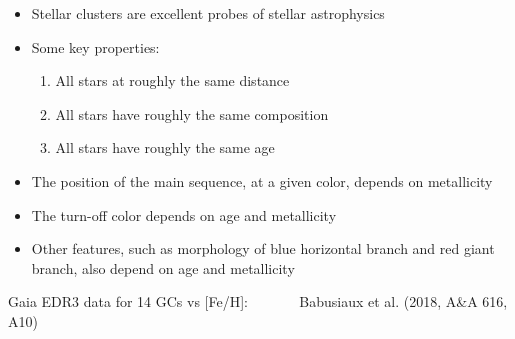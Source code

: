 \documentclass[letterpaper,landscape]{slides}
\begin{document}
\begin{slide}
{\begin{minipage}[t]{12cm}
\begin{itemize}
\item Stellar clusters are excellent probes of stellar astrophysics
\item {\color{blue} Some key properties:} 
   \begin{enumerate}
      \item All stars at roughly the same distance
      \item All stars have roughly the same composition
      \item All stars have roughly the same age
   \end{enumerate}
\item The position of the main sequence, at a given color, 
       depends on metallicity 
\item The turn-off color depends on age and metallicity 
\item Other features, such as morphology of blue horizontal 
   branch and red giant branch, also depend on age and metallicity 

\end{itemize}

\end{minipage}}
\vfill 
\end{slide}




\begin{slide}
	\begin{center}
		\begin{minipage}{6in}
			\vskip -0.5in
			\hskip -2.2in
			{}
			\vskip -0.5in
			{Gaia EDR3 data for 14 GCs vs [Fe/H]: \,\,\,\,\,\,\,\,\,\,\,\,\,\,\,\,\,\, Babusiaux et al. (2018, A\&A 616, A10)}
		\end{minipage}
	\end{center}
	\vfill
\end{slide}
\end{document}

